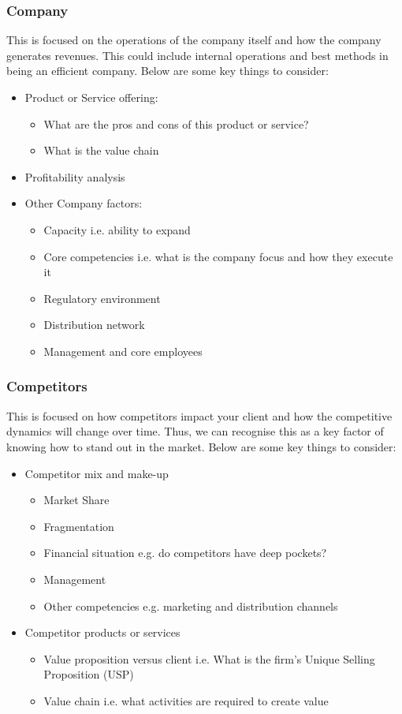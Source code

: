 \documentclass[a4paper]{article}
\begin{document}
{\subsubsection{Company}
This is focused on the operations of the company itself and how the company generates revenues. This could include internal operations and best methods in being an efficient company. Below are some key things to consider:

\begin{itemize}
	\item Product or Service offering:
		\begin{itemize} 
			\item What are the pros and cons of this product or service?
			\item What is the value chain
		\end{itemize}
	\item Profitability analysis
	\item Other Company factors:
		\begin{itemize}
			\item Capacity i.e. ability to expand
			\item Core competencies i.e. what is the company focus and how they execute it
			\item Regulatory environment
			\item Distribution network
			\item Management and core employees
		\end{itemize}
\end{itemize}

\subsubsection{Competitors}
This is focused on how competitors impact your client and how the competitive dynamics will change over time. Thus, we can recognise this as a key factor of knowing how to stand out in the market. Below are some key things to consider:

\begin{itemize}
	\item Competitor mix and make-up
		\begin{itemize}
			\item Market Share
			\item Fragmentation
			\item Financial situation e.g. do competitors have deep pockets?
			\item Management
			\item Other competencies e.g. marketing and distribution channels
		\end{itemize}
	\item Competitor products or services
		\begin{itemize}
			\item Value proposition versus client i.e. What is the firm's Unique Selling Proposition (USP)
			\item Value chain i.e. what activities are required to create value
		\end{itemize}
\end{itemize}

}
\end{document}
